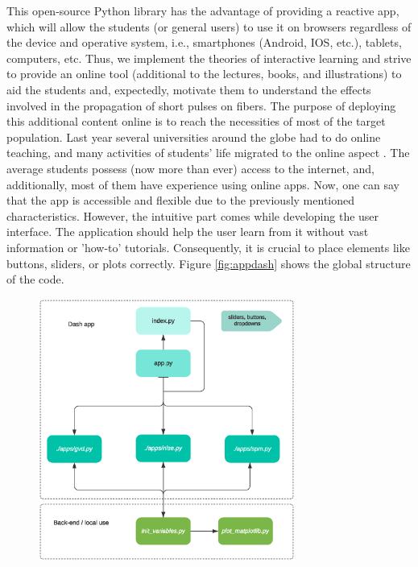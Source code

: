     This open-source Python library has the advantage of providing a reactive app, which will allow the students (or general users) to use it on browsers regardless of the device and operative system, i.e., smartphones (Android, IOS, etc.), tablets, computers, etc. Thus, we implement the theories of interactive learning and strive to provide an online tool (additional to the lectures, books, and illustrations) to aid the students and, expectedly, motivate them to understand the effects involved in the propagation of short pulses on fibers. 
    The purpose of deploying this additional content online is to reach the necessities of most of the target population. Last year several universities around the globe had to do online teaching, and many activities of students' life migrated to the online aspect \citep{Hassel2020}. The average students possess (now more than ever) access to the internet, and, additionally, most of them have experience using online apps. Now, one can say that the app is accessible and flexible due to the previously mentioned characteristics. However, the intuitive part comes while developing the user interface. The application should help the user learn from it without vast information or 'how-to' tutorials. Consequently, it is crucial to place elements like buttons, sliders, or plots correctly. Figure \ref{fig:appdash} shows the global structure of the code. 
    
    \begin{figure}[label={fig:appdash}, caption={Global structure of the code.}]
        	\includegraphics[trim = 0cm 0.5cm 0 1.2cm, clip, width=0.75\textwidth]{figures/chap3/Apps.eps} 
        \end{figure}
    

